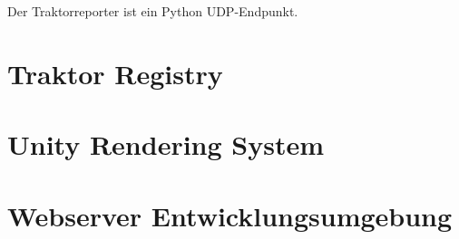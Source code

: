 Der Traktorreporter ist ein Python UDP-Endpunkt.
\section{Traktor Registry}
\label{section:Traktor Registry}
\section{Unity Rendering System}
\label{section:Unity Rendering System}
\section{ Webserver Entwicklungsumgebung }
\label{section:Webserver Entwicklungsumgebung}
